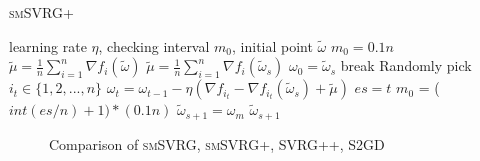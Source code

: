 \documentclass[conference]{IEEEtran}
\begin{document}
 \begin{algorithm}
 	\caption{\textsc{smSVRG+}}
	\label{smSVRG+}
	\begin{algorithmic}[1]
	\Require learning rate $\eta$, checking interval $m_0$, initial point $\tilde{\omega}$
	\Initial $m_0=0.1n$
	\State $\tilde{\mu} = \frac{1}{n}\sum\limits_{i=1}^{n}\nabla f_{i}(\tilde{\omega})$
		\State $\tilde{\mu} = \frac{1}{n}\sum\limits_{i=1}^{n}\nabla f_{i}(\tilde{\omega}_{s})$
		\State $\omega_0 = \tilde{\omega}_s$
			\State break
			\EndIf
			\State Randomly pick $i_t\in\{1, 2, ..., n\}$
			\State $\omega_t = \omega_{t-1} - \eta(\nabla f_{i_t} - \nabla f_{i_t}(\tilde{\omega}_s)+\tilde{\mu})$
		\EndFor
		\State $es = t$	
		\State $m_0$ = ($int(es/n)+1) * (0.1n)$
		\State $\tilde{\omega}_{s+1} = \omega_{m}$
	\EndFor
	\State \Return $\tilde{\omega}_{s+1}$
	\end{algorithmic}
\end{algorithm}
 
 \begin{figure}[htb]
\centering
{}
\label{cmijcnn1}
\caption{Comparison of \textsc{smSVRG}, \textsc{smSVRG+}, SVRG++, S2GD}
\end{figure}
 
\end{document}
